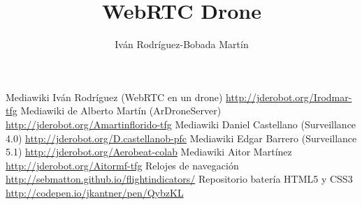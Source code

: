 \documentclass[oneside,a4paper,12pt]{book}
\title{WebRTC Drone}
\author{Iván Rodríguez-Bobada Martín}
\begin{document}







\begin{thebibliography}{99}

 Mediawiki Iván Rodríguez (WebRTC en un drone) \url{http://jderobot.org/Irodmar-tfg} 
 Mediawiki de Alberto Martín (ArDroneServer) \url{http://jderobot.org/Amartinflorido-tfg}
 Mediawiki Daniel Castellano (Surveillance 4.0) \url{http://jderobot.org/D.castellanob-pfc} 
 Mediawiki Edgar Barrero (Surveillance 5.1) \url{http://jderobot.org/Aerobeat-colab}
 Mediawiki Aitor Martínez \url{http://jderobot.org/Aitormf-tfg}
 Relojes de navegación \url{http://sebmatton.github.io/flightindicators/}
 Repositorio batería HTML5 y CSS3 \url{http://codepen.io/jkantner/pen/QybzKL}

\end{thebibliography} 
\end{document}
